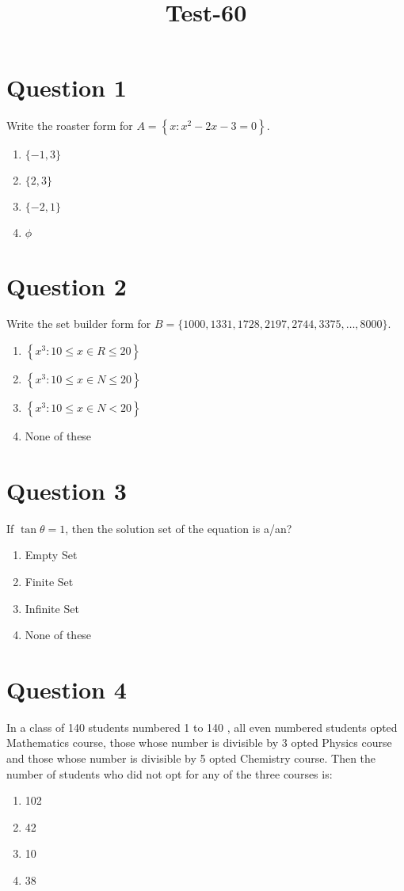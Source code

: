 \documentclass{article}
\title{Test-60}
\begin{document}
                    \maketitle
                    \section*{Question 1}
Write the roaster form for \(A=\left\{x: x^{2}-2 x-3=0\right\}\).
\begin{enumerate}[label=(\alph*)]
\item \(\{-1,3\}\)
\item \(\{2,3\}\)
\item \(\{-2,1\}\)
\item \(\phi\)
\end{enumerate}
\newpage
\section*{Question 2}
Write the set builder form for \(B=\{1000,1331,1728,2197, 2744, 3375, \ldots, 8000\}\).
\begin{enumerate}[label=(\alph*)]
\item \(\left\{x^{3}: 10 \leq x \in R \leq 20\right\}\)
\item \(\left\{x^{3}: 10 \leq x \in N \leq 20\right\}\)
\item \(\left\{x^{3}: 10 \leq x \in N<20\right\}\) 
\item None of these
\end{enumerate}
\newpage
\section*{Question 3}
If \(\tan \theta=1\), then the solution set of the equation is a/an?
\begin{enumerate}[label=(\alph*)]
\item Empty Set
\item Finite Set
\item Infinite Set
\item None of these
\end{enumerate}
\newpage
\section*{Question 4}
In a class of 140 students numbered 1 to 140 , all even numbered students opted Mathematics course, those whose number is divisible by 3 opted Physics course and those whose number is divisible by 5 opted Chemistry course. Then the number of students who did not opt for any of the three courses is:
\begin{enumerate}[label=(\alph*)]
\item 102
\item 42
\item 10
\item 38
\end{enumerate}
\newpage
\end{document}
